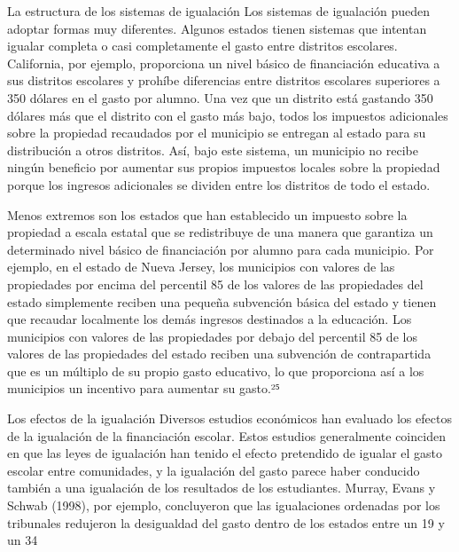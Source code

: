 \documentclass[10pt,a4paper]{article}
\begin{document}
La estructura de los sistemas de igualación 
Los sistemas de igualación pueden adoptar formas muy diferentes. Algunos estados tienen sistemas que intentan igualar completa o casi completamente el gasto entre distritos escolares. California, por ejemplo, proporciona un nivel básico de financiación educativa a sus distritos escolares y prohíbe diferencias entre distritos escolares superiores a 350 dólares en el gasto por alumno. Una vez que un distrito está gastando 350 dólares más que el distrito con el gasto más bajo, todos los impuestos adicionales sobre la propiedad recaudados por el municipio se entregan al estado para su distribución a otros distritos. Así, bajo este sistema, un municipio no recibe ningún beneficio por aumentar sus propios impuestos locales sobre la propiedad porque los ingresos adicionales se dividen entre los distritos de todo el estado.

Menos extremos son los estados que han establecido un impuesto sobre la propiedad a escala estatal que se redistribuye de una manera que garantiza un determinado nivel básico de financiación por alumno para cada municipio. Por ejemplo, en el estado de Nueva Jersey, los municipios con valores de las propiedades por encima del percentil 85 de los valores de las propiedades del estado simplemente reciben una pequeña subvención básica del estado y tienen que recaudar localmente los demás ingresos destinados a la educación. Los municipios con valores de las propiedades por debajo del percentil 85 de los valores de las propiedades del estado reciben una subvención de contrapartida que es un múltiplo de su propio gasto educativo, lo que proporciona así a los municipios un incentivo para aumentar su gasto.²⁵

Los efectos de la igualación 
Diversos estudios económicos han evaluado los efectos de la igualación de la financiación escolar. Estos estudios generalmente coinciden en que las leyes de igualación han tenido el efecto pretendido de igualar el gasto escolar entre comunidades, y la igualación del gasto parece haber conducido también a una igualación de los resultados de los estudiantes. Murray, Evans y Schwab (1998), por ejemplo, concluyeron que las igualaciones ordenadas por los tribunales redujeron la desigualdad del gasto dentro de los estados entre un 19 y un 34 %
\end{document}
